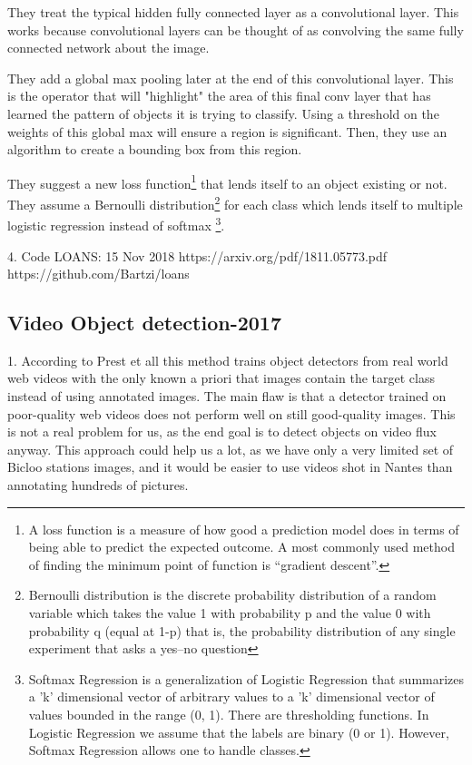 \documentclass[10pt]{article}
\begin{document}
They treat the typical hidden fully connected layer as a convolutional layer. This works because convolutional layers can be thought of as convolving the same fully connected network about the image. 

They add a global max pooling later at the end of this convolutional layer. This is the operator that will "highlight" the area of this final conv layer that has learned the pattern of objects it is trying to classify. Using a threshold on the weights of this global max will ensure a region is significant. Then, they use an algorithm to create a bounding box from this region.

They suggest a new loss function\footnote{A loss function is a measure of how good a prediction model does in terms of being able to predict the expected outcome. A most commonly used method of finding the minimum point of function is “gradient descent”.} that lends itself to an object existing or not. 
They assume a Bernoulli distribution\footnote{Bernoulli distribution is the discrete probability distribution of a random variable which takes the value 1 with probability p and the value 0 with probability q (equal at 1-p)  that is, the probability distribution of any single experiment that asks a yes–no question} for each class which lends itself to multiple logistic regression instead of softmax \footnote{Softmax Regression is a generalization of Logistic Regression that summarizes a 'k' dimensional vector of arbitrary values to a 'k' dimensional vector of values bounded in the range (0, 1). There are thresholding functions. In Logistic Regression we assume that the labels are binary (0 or 1). However, Softmax Regression allows one to handle classes.}.


4. 
Code LOANS:  15 Nov 2018
https://arxiv.org/pdf/1811.05773.pdf
https://github.com/Bartzi/loans 


\subsection{Video Object detection-2017}
1. According to Prest et all \cite{VideoDetection} this method trains object detectors from real world web videos with the only known a priori that images contain the target class instead of using annotated images. The main flaw is that a detector trained on poor-quality web videos does not perform well on still good-quality images. This is not a real problem for us, as the end goal is to detect objects on video flux anyway. This approach could help us a lot, as we have only a very limited set of Bicloo stations images, and it would be easier to use videos shot in Nantes than annotating hundreds of pictures.\\
\end{document}
